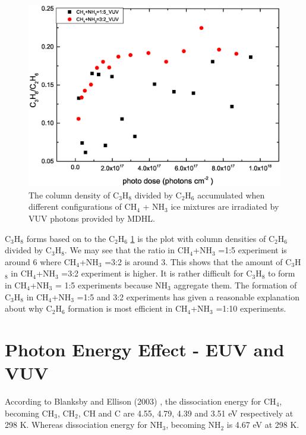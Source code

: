 \begin{figure}
\centering
\includegraphics[width=\textwidth]{figures/chapter3/Lab_C3H8_C2H6.eps}
\caption{The column density of C$_3$H$_8$ divided by C$_2$H$_6$ accumulated when different configurations of CH$_4$ + NH$_3$ ice mixtures are irradiated by VUV photons provided by MDHL.}
\label{fig:C2H6_C3H8}
\end{figure}

C$_3$H$_8$ forms based on to the C$_2$H$_6$ \ref{fig:C2H6_C3H8} is the plot with column densities of C$_2$H$_6$ divided by C$_3$H$_8$. We may see that the ratio in CH$_4$+NH$_3$ =1:5 experiment is around 6 where CH$_4$+NH$_3$ =3:2 is around 3. This shows that the amount of C$_3$H$_8$ in CH$_4$+NH$_3$ =3:2 experiment is higher. It is rather difficult for C$_3$H$_8$ to form in CH$_4$+NH$_3$ = 1:5 experiments because NH$_3$ aggregate them. The formation of C$_3$H$_8$ in CH$_4$+NH$_3$ =1:5 and 3:2 experiments has given a reasonable explanation about why C$_2$H$_6$ formation is most efficient in CH$_4$+NH$_3$ =1:10 experiments.



\section{Photon Energy Effect - EUV and VUV} %

According to Blanksby and Ellison (2003) \cite{blanksby2003bond}, the dissociation energy for CH$_4$, becoming CH$_3$, CH$_2$, CH and C are 4.55, 4.79, 4.39 and 3.51 eV respectively at 298 K. Whereas dissociation energy for NH$_3$, becoming NH$_2$ is 4.67 eV at 298 K.

